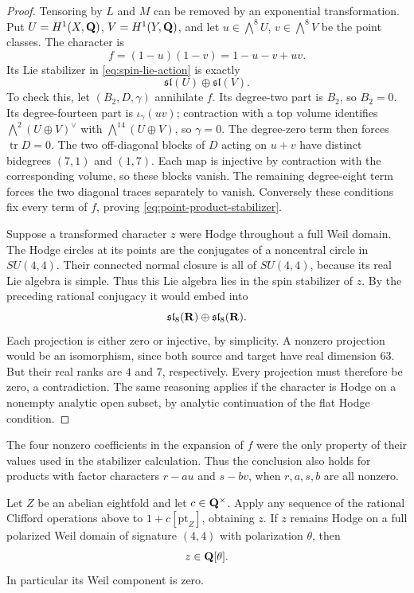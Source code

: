 \begin{proof}
Tensoring by $L$ and $M$ can be removed by an exponential transformation. Put $U=H^1(X,\mathbf Q)$, $V=H^1(Y,\mathbf Q)$, and let $u\in\bigwedge^8U$, $v\in\bigwedge^8V$ be the point classes. The character is
\[
 f=(1-u)(1-v)=1-u-v+uv.
\]
Its Lie stabilizer in \eqref{eq:spin-lie-action} is exactly
\begin{equation}\label{eq:point-product-stabilizer}
 \mathfrak{sl}(U)\oplus\mathfrak{sl}(V).
\end{equation}
To check this, let $(B_2,D,\gamma)$ annihilate $f$. Its degree-two part is $B_2$, so $B_2=0$. Its degree-fourteen part is $\iota_\gamma(uv)$; contraction with a top volume identifies $\bigwedge^2(U\oplus V)^\vee$ with $\bigwedge^{14}(U\oplus V)$, so $\gamma=0$. The degree-zero term then forces $\operatorname{tr}D=0$. The two off-diagonal blocks of $D$ acting on $u+v$ have distinct bidegrees $(7,1)$ and $(1,7)$. Each map is injective by contraction with the corresponding volume, so these blocks vanish. The remaining degree-eight term forces the two diagonal traces separately to vanish. Conversely these conditions fix every term of $f$, proving \eqref{eq:point-product-stabilizer}.

Suppose a transformed character $z$ were Hodge throughout a full Weil domain. The Hodge circles at its points are the conjugates of a noncentral circle in $SU(4,4)$. Their connected normal closure is all of $SU(4,4)$, because its real Lie algebra is simple. Thus this Lie algebra lies in the spin stabilizer of $z$. By the preceding rational conjugacy it would embed into
\[
 \mathfrak{sl}_8(\mathbf R)\oplus\mathfrak{sl}_8(\mathbf R).
\]
Each projection is either zero or injective, by simplicity. A nonzero projection would be an isomorphism, since both source and target have real dimension $63$. But their real ranks are $4$ and $7$, respectively. Every projection must therefore be zero, a contradiction. The same reasoning applies if the character is Hodge on a nonempty analytic open subset, by analytic continuation of the flat Hodge condition.
\end{proof}

The four nonzero coefficients in the expansion of $f$ were the only property of their values used in the stabilizer calculation. Thus the conclusion also holds for products with factor characters $r-au$ and $s-bv$, when $r,a,s,b$ are all nonzero.

\begin{proposition}\label{prop:single-point-spin}
Let $Z$ be an abelian eightfold and let $c\in\mathbf Q^\times$. Apply any sequence of the rational Clifford operations above to $1+c[\mathrm{pt}_Z]$, obtaining $z$. If $z$ remains Hodge on a full polarized Weil domain of signature $(4,4)$ with polarization $\theta$, then
\[
 z\in\mathbf Q[\theta].
\]
In particular its Weil component is zero.
\end{proposition}

